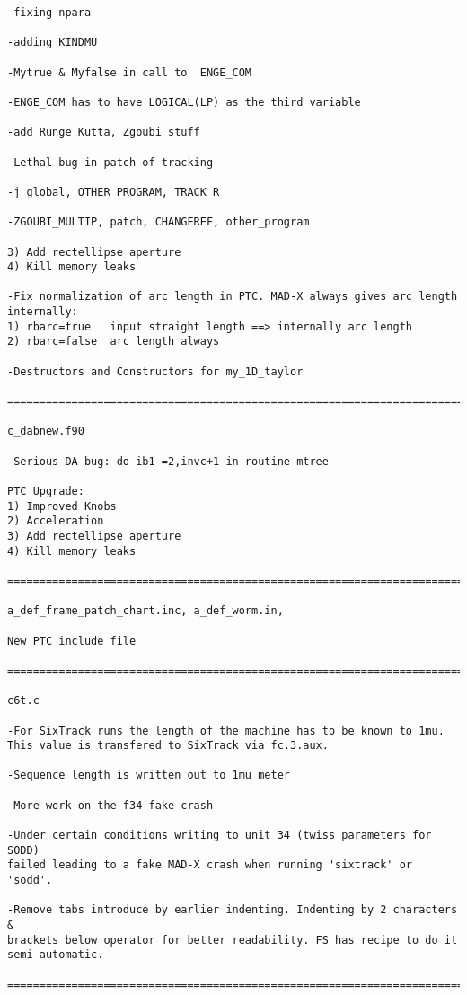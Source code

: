 \begin{verbatim}
-fixing npara

-adding KINDMU

-Mytrue & Myfalse in call to  ENGE_COM

-ENGE_COM has to have LOGICAL(LP) as the third variable

-add Runge Kutta, Zgoubi stuff

-Lethal bug in patch of tracking

-j_global, OTHER PROGRAM, TRACK_R

-ZGOUBI_MULTIP, patch, CHANGEREF, other_program

3) Add rectellipse aperture
4) Kill memory leaks

-Fix normalization of arc length in PTC. MAD-X always gives arc length
internally:
1) rbarc=true   input straight length ==> internally arc length
2) rbarc=false  arc length always

-Destructors and Constructors for my_1D_taylor

=============================================================================

c_dabnew.f90

-Serious DA bug: do ib1 =2,invc+1 in routine mtree

PTC Upgrade:
1) Improved Knobs
2) Acceleration
3) Add rectellipse aperture
4) Kill memory leaks

=============================================================================

a_def_frame_patch_chart.inc, a_def_worm.in,

New PTC include file

=============================================================================

c6t.c

-For SixTrack runs the length of the machine has to be known to 1mu.
This value is transfered to SixTrack via fc.3.aux.

-Sequence length is written out to 1mu meter

-More work on the f34 fake crash

-Under certain conditions writing to unit 34 (twiss parameters for SODD)
failed leading to a fake MAD-X crash when running 'sixtrack' or 'sodd'.

-Remove tabs introduce by earlier indenting. Indenting by 2 characters &
brackets below operator for better readability. FS has recipe to do it
semi-automatic.

=============================================================================


\end{verbatim}
